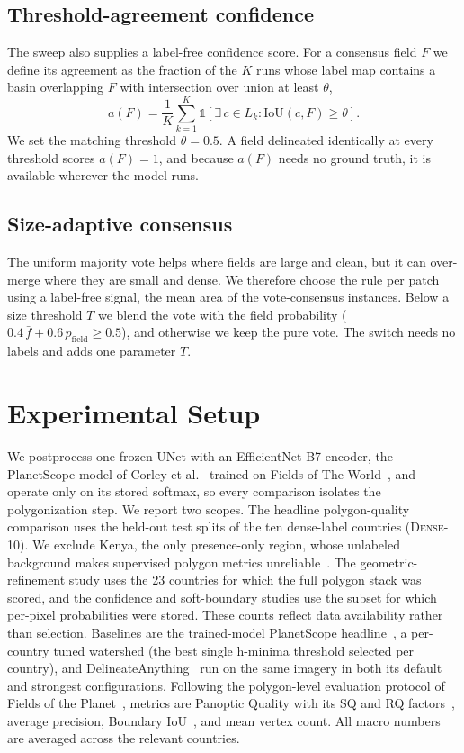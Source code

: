 \documentclass[conference]{IEEEtran}
\begin{document}
\subsection{Threshold-agreement confidence}
\label{sec:confidence}
The sweep also supplies a label-free confidence score. For a consensus field $F$ we define its agreement as the fraction of the $K$ runs whose label map contains a basin overlapping $F$ with intersection over union at least $\theta$,
\begin{equation}
a(F) = \frac{1}{K}\sum_{k=1}^{K}\mathbb{1}\!\left[\exists\, c \in L_k : \mathrm{IoU}(c, F) \geq \theta\right].
\label{eq:agree}
\end{equation}
We set the matching threshold $\theta = 0.5$. A field delineated identically at every threshold scores $a(F)=1$, and because $a(F)$ needs no ground truth, it is available wherever the model runs.

\subsection{Size-adaptive consensus}
\label{sec:adaptive}
The uniform majority vote helps where fields are large and clean, but it can over-merge where they are small and dense. We therefore choose the rule per patch using a label-free signal, the mean area of the vote-consensus instances. Below a size threshold $T$ we blend the vote with the field probability ($0.4\,\bar{f} + 0.6\,p_{\text{field}} \geq 0.5$), and otherwise we keep the pure vote. The switch needs no labels and adds one parameter $T$.

\section{Experimental Setup}
\label{sec:setup}
We postprocess one frozen UNet with an EfficientNet-B7 encoder, the PlanetScope model of Corley et al.~\cite{corley_ftp} trained on Fields of The World~\cite{kerner2024ftw}, and operate only on its stored softmax, so every comparison isolates the polygonization step. We report two scopes. The headline polygon-quality comparison uses the held-out test splits of the ten dense-label countries (\textsc{Dense-10}). We exclude Kenya, the only presence-only region, whose unlabeled background makes supervised polygon metrics unreliable~\cite{kerner2024ftw}. The geometric-refinement study uses the 23 countries for which the full polygon stack was scored, and the confidence and soft-boundary studies use the subset for which per-pixel probabilities were stored. These counts reflect data availability rather than selection. Baselines are the trained-model PlanetScope headline~\cite{corley_ftp}, a per-country tuned watershed (the best single h-minima threshold selected per country), and DelineateAnything~\cite{lavreniuk2025delineateanything} run on the same imagery in both its default and strongest configurations. Following the polygon-level evaluation protocol of Fields of the Planet~\cite{corley_ftp}, metrics are Panoptic Quality with its SQ and RQ factors~\cite{kirillov2019panoptic}, average precision, Boundary IoU~\cite{cheng2021boundaryiou}, and mean vertex count. All macro numbers are averaged across the relevant countries.
\end{document}
